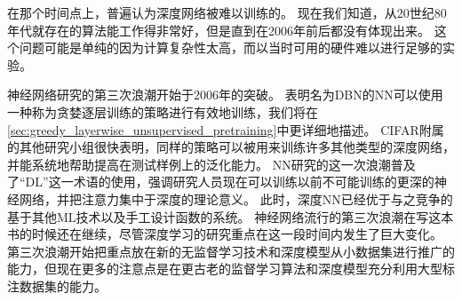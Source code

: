 
在那个时间点上，普遍认为深度网络被难以训练的。
现在我们知道，从20世纪80年代就存在的算法能工作得非常好，但是直到在2006年前后都没有体现出来。
这个问题可能是单纯的因为计算复杂性太高，而以当时可用的硬件难以进行足够的实验。

神经网络研究的第三次浪潮开始于2006年的突破。
表明名为\gls{DBN}的\gls{NN}可以使用一种称为贪婪逐层训练的策略进行有效地训练\citep{Hinton06}，我们将在\ref{sec:greedy_layerwise_unsupervised_pretraining}中更详细地描述。
CIFAR附属的其他研究小组很快表明，同样的策略可以被用来训练许多其他类型的深度网络\citep{Bengio+Lecun-chapter2007-small,ranzato-07}，并能系统地帮助提高在测试样例上的泛化能力。
\gls{NN}研究的这一次浪潮普及了``\gls{DL}''这一术语的使用，强调研究人员现在可以训练以前不可能训练的更深的神经网络，并把注意力集中于深度的理论意义\citep{Bengio+Lecun-chapter2007,Delalleau+Bengio-2011-small,Pascanu-et-al-ICLR2014,Montufar-et-al-NIPS2014}。
此时，深度\gls{NN}已经优于与之竞争的基于其他\gls{ML}技术以及手工设计函数的系统。
神经网络流行的第三次浪潮在写这本书的时候还在继续，尽管深度学习的研究重点在这一段时间内发生了巨大变化。
第三次浪潮开始把重点放在新的无监督学习技术和深度模型从小数据集进行推广的能力，但现在更多的注意点是在更古老的监督学习算法和深度模型充分利用大型标注数据集的能力。

